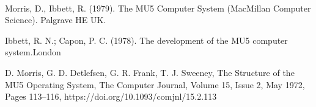 \documentclass[a4paper,lithuanian]{article}
\begin{document}
\

\begin{thebibliography}{9}
Morris, D., Ibbett, R. (1979). The MU5 Computer System (MacMillan Computer Science). Palgrave HE UK.

Ibbett, R. N.; Capon, P. C. (1978). The development of the MU5 computer system.London

D. Morris, G. D. Detlefsen, G. R. Frank, T. J. Sweeney, The Structure of the MU5 Operating System, The Computer Journal, Volume 15, Issue 2, May 1972, Pages 113–116, https://doi.org/10.1093/comjnl/15.2.113
\end{thebibliography}
\end{document}
